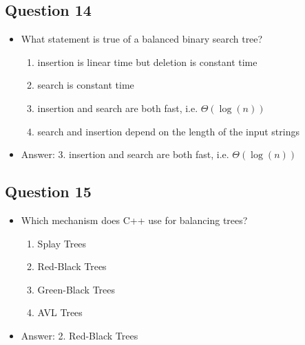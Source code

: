 \begin{slide}
\section[-1]{Question 14}

\begin{PauseHighLight}
  \begin{itemize}
  \item What statement is true of a balanced binary search tree?
    \begin{enumerate}
    \item insertion is linear time but deletion is constant time
    \item search is constant time
    \item insertion and search are both fast, i.e. $\Theta(\log(n))$
    \item search and insertion depend on the length of the input strings\pause
    \end{enumerate}
  \item Answer: 3. insertion and search are both fast, i.e. $\Theta(\log(n))$\pauseb
  \end{itemize}
\end{PauseHighLight}
\end{slide}

\begin{slide}
\section[-1]{Question 15}

\begin{PauseHighLight}
  \begin{itemize}
  \item Which mechanism does C++ use for balancing trees?
    \begin{enumerate}
    \item Splay Trees
    \item Red-Black Trees
    \item Green-Black Trees
    \item AVL Trees\pause
    \end{enumerate}
  \item Answer: 2. Red-Black Trees\pauseb
  \end{itemize}
\end{PauseHighLight}
\end{slide}

